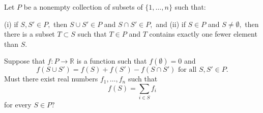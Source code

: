 Let $P$ be a nonempty collection of subsets of $\{1,\dots,n\}$ such that:

(i) if $S,S'\in P,$ then $S\cup S'\in P$ and $S\cap S'\in P,$ and
(ii) if $S\in P$ and $S\ne\emptyset,$ then there is a subset $T\subset S$ such that $T\in P$ and $T$ contains exactly one fewer element than $S.$

Suppose that $f:P\to\mathbb{R}$ is a function such that $f(\emptyset)=0$ and \[f(S\cup S')= f(S)+f(S')-f(S\cap S')\text{ for all }S,S'\in P.\] Must there exist real numbers $f_1,\dots,f_n$ such that \[f(S)=\sum_{i\in S}f_i\] for every $S\in P?$